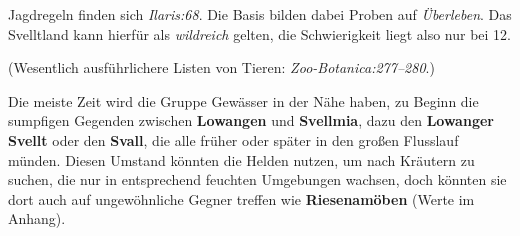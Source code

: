 Jagdregeln finden sich \emph{Ilaris:68}. Die Basis bilden dabei Proben auf \emph{Überleben}.
Das Svelltland kann hierfür als \emph{wildreich} gelten, die Schwierigkeit liegt also nur bei 12.

(Wesentlich ausführlichere Listen von Tieren: \emph{Zoo-Botanica:277--280}.)

Die meiste Zeit wird die Gruppe Gewässer in der Nähe haben, zu Beginn die sumpfigen Gegenden zwischen \textbf{Lowangen} und \textbf{Svellmia},
dazu den \textbf{Lowanger Svellt} oder den \textbf{Svall}, die alle früher oder später in den großen Flusslauf münden.
Diesen Umstand könnten die Helden nutzen, um nach Kräutern zu suchen, die nur in entsprechend feuchten Umgebungen wachsen, doch könnten sie dort auch auf ungewöhnliche Gegner treffen wie \textbf{Riesenamöben} (Werte im Anhang).

